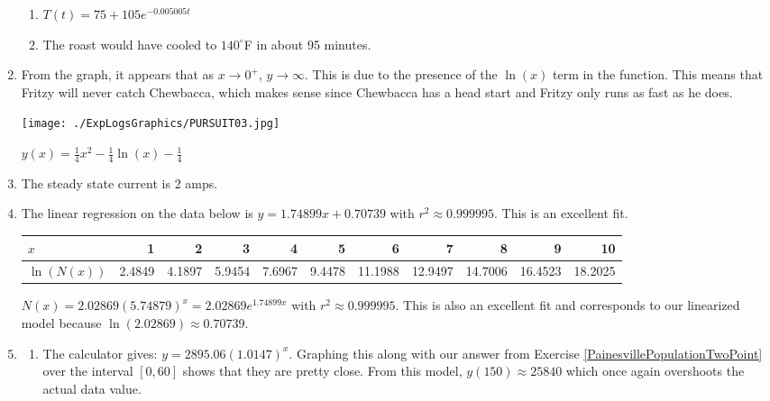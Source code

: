 \begin{enumerate}
\begin{enumerate}
\item $T(t) = 75 + 105e^{-0.005005t}$

\item The roast would have cooled to $140^{\circ}$F in about 95 minutes.

\end{enumerate}

\item From the graph, it appears that as $x \rightarrow 0^{+}$, $y \rightarrow \infty$.  This is due to the presence of the $\ln(x)$ term in the function.  This means that Fritzy will never catch Chewbacca, which makes sense since Chewbacca has a head start and Fritzy only runs as fast as he does.

\begin{center}

\texttt{[image: ./ExpLogsGraphics/PURSUIT03.jpg]} 

\smallskip

$y(x) = \frac{1}{4} x^2-\frac{1}{4} \ln(x)-\frac{1}{4}$

\end{center}

\item The steady state current is 2 amps.

\addtocounter{enumi}{2}

\item The linear regression on the data below is $y = 1.74899x + 0.70739$ with $r^{2} \approx 0.999995$.  This is an excellent fit.

\scriptsize

\noindent \begin{tabular}{|l|r|r|r|r|r|r|r|r|r|r|} \hline
$x$ & 1 & 2 & 3 & 4 & 5 & 6 & 7 & 8 & 9 & 10 \\ 
\hline 
$\ln(N(x))$ & 2.4849 & 4.1897 & 5.9454 & 7.6967 & 9.4478 & 11.1988 & 12.9497 & 14.7006 & 16.4523 & 18.2025 \\ \hline
\end{tabular}

\normalsize

$N(x) = 2.02869(5.74879)^{x} = 2.02869e^{1.74899x}$ with $r^{2} \approx 0.999995$.  This is also an excellent fit and corresponds to our linearized model because $\ln(2.02869) \approx 0.70739$.

\item  \begin{enumerate}  \item  The calculator gives:  $y = 2895.06 (1.0147)^{x}$.  Graphing this along with our answer from Exercise \ref{PainesvillePopulationTwoPoint} over the interval $[0,60]$ shows that they are pretty close. From this model, $y(150) \approx 25840$ which once again overshoots the actual data value.


\end{enumerate}
\end{enumerate}
